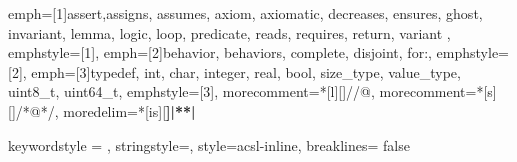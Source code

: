 {	emph=[1]{assert,assigns, assumes, axiom, axiomatic, decreases, ensures, ghost, invariant, lemma, logic, loop,
             predicate, reads, requires, return, variant },
	emphstyle=[1]{\bfseries\color{coASCLKeyword}},
	emph=[2]{behavior, behaviors, complete, disjoint, for:},
	emphstyle=[2]{\bfseries\color{coACSLBehavior}},
	emph=[3]{typedef, int, char, integer, real, bool, size_type, value_type, uint8_t,  uint64_t},
	emphstyle=[3]{\bfseries\color{coCKeyword}},
	morecomment=*[l][\color{coASCL}]{//@},
	morecomment=*[s][\color{coASCL}]{/*@}{*/},
	moredelim=*[is][\bfseries]{|*}{*|}
}

{      %
	keywordstyle = \ttfamily\normal\color{coASCL},
	stringstyle=\color{coASCL},
	style=acsl-inline,
	breaklines= false
}


